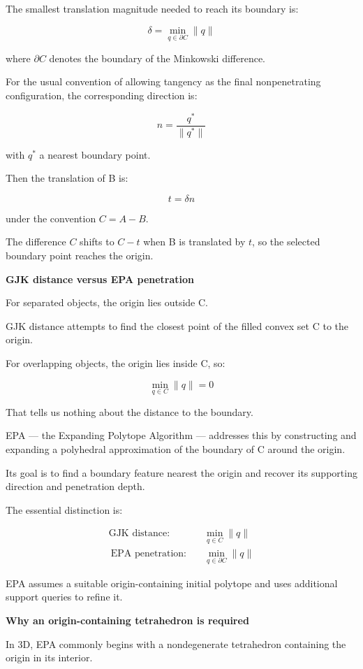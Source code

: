 The smallest translation magnitude needed to reach its boundary is:

\[
\boxed{ \delta=\min_{q\in\partial C}\|q\| }
\]

where \(\partial C\) denotes the boundary of the Minkowski difference.

For the usual convention of allowing tangency as the final nonpenetrating configuration, the corresponding direction is:

\[
\boxed{ n=\frac{q^*}{\|q^*\|} }
\]

with \(q^*\) a nearest boundary point.

Then the translation of B is:

\[
\boxed{ t=\delta n }
\]

under the convention \(C=A-B\).

The difference \(C\) shifts to \(C-t\) when B is translated by \(t\), so the selected boundary point reaches the origin.

\textbf{GJK distance versus EPA penetration}

For separated objects, the origin lies outside C.

GJK distance attempts to find the closest point of the filled convex set C to the origin.

For overlapping objects, the origin lies inside C, so:

\[
\min_{q\in C}\|q\|=0
\]

That tells us nothing about the distance to the boundary.

EPA --- the Expanding Polytope Algorithm --- addresses this by constructing and expanding a polyhedral approximation of the boundary of C around the origin.

Its goal is to find a boundary feature nearest the origin and recover its supporting direction and penetration depth.

The essential distinction is:

\[
\boxed{ \begin{aligned} \text{GJK distance:}&\quad \min_{q\in C}\|q\|\\\ \text{EPA penetration:}&\quad \min_{q\in\partial C}\|q\| \end{aligned} }
\]

EPA assumes a suitable origin-containing initial polytope and uses additional support queries to refine it.

\textbf{Why an origin-containing tetrahedron is required}

In 3D, EPA commonly begins with a nondegenerate tetrahedron containing the origin in its interior.

